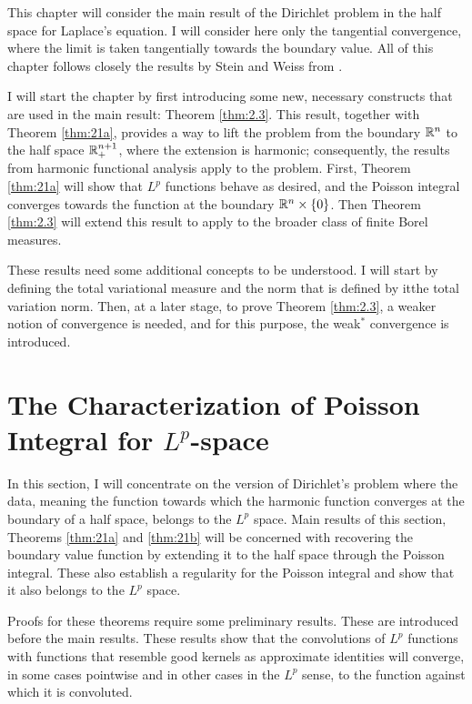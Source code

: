 This chapter will consider the main result of the Dirichlet problem in the half space for Laplace's equation. I will consider here only the tangential convergence, where the limit is taken tangentially towards the boundary value. All of this chapter follows closely the results by Stein and Weiss from \cite{stein_weiss}.

I will start the chapter by first introducing some new, necessary constructs that are used in the main result: Theorem \ref{thm:2.3}. This result, together with Theorem \ref{thm:21a}, provides a way to lift the problem from the boundary $\mathbb R^n$ to the half space $\mathbb R^{n+1}_+$, where the extension is harmonic; consequently, the results from harmonic functional analysis apply to the problem. First, Theorem \ref{thm:21a} will show that $L^p$ functions behave as desired, and the Poisson integral converges towards the function at the boundary $\mathbb R^n\times\{0\}$. Then Theorem \ref{thm:2.3} will extend this result to apply to the broader class of finite Borel measures.

These results need some additional concepts to be understood. I will start by defining the total variational measure and the norm that is defined by it\textemdash the total variation norm. Then, at a later stage, to prove Theorem \ref{thm:2.3}, a weaker notion of convergence is needed, and for this purpose, the weak$^*$ convergence is introduced.

\section{The Characterization of Poisson Integral for $L^p$-space}\label{sec:LP}

In this section, I will concentrate on the version of Dirichlet's problem where the data, meaning the function towards which the harmonic function converges at the boundary of a half space, belongs to the $L^p$ space. Main results of this section, Theorems \ref{thm:21a} and \ref{thm:21b} will be concerned with recovering the boundary value function by extending it to the half space through the Poisson integral. These also establish a regularity for the Poisson integral and show that it also belongs to the $L^p$ space.

Proofs for these theorems require some preliminary results. These are introduced before the main results. These results show that the convolutions of $L^p$ functions with functions that resemble good kernels as approximate identities will converge, in some cases pointwise and in other cases in the $L^p$ sense, to the function against which it is convoluted.

